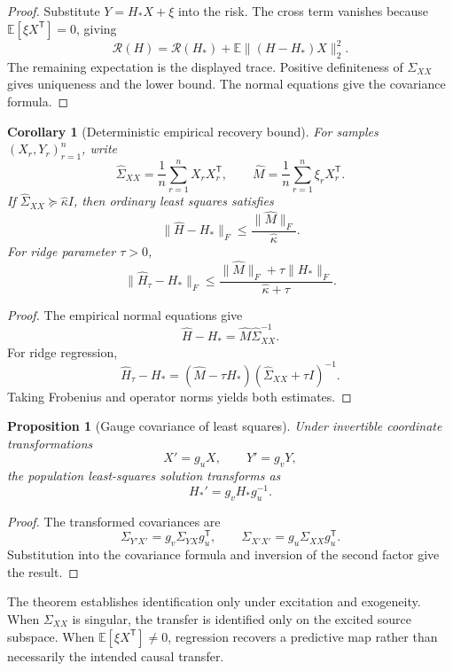\documentclass[11pt,letterpaper]{article}
\theoremstyle{plain}
\newtheorem{proposition}[theorem]{Proposition}
\newtheorem{corollary}[theorem]{Corollary}
\theoremstyle{definition}
\begin{document}
\begin{proof}
Substitute \(Y=H_*X+\xi\) into the risk. The cross term vanishes because
\(\mathbb E[\xi X^{\mathsf T}]=0\), giving
\[
\mathcal R(H)
=
\mathcal R(H_*)
+
\mathbb E\|(H-H_*)X\|_2^2.
\]
The remaining expectation is the displayed trace. Positive definiteness of
\(\Sigma_{XX}\) gives uniqueness and the lower bound. The normal equations
give the covariance formula.
\end{proof}

\begin{corollary}[Deterministic empirical recovery bound]
\label{cor:empirical-transfer-bound}
For samples \((X_r,Y_r)_{r=1}^n\), write
\[
\widehat\Sigma_{XX}
=
\frac1n\sum_{r=1}^nX_rX_r^{\mathsf T},
\qquad
\widehat M
=
\frac1n\sum_{r=1}^n\xi_rX_r^{\mathsf T}.
\]
If \(\widehat\Sigma_{XX}\succeq\widehat\kappa I\), then ordinary least squares
satisfies
\[
\boxed{
\|\widehat H-H_*\|_F
\leq
\frac{\|\widehat M\|_F}{\widehat\kappa}.
}
\]
For ridge parameter \(\tau>0\),
\[
\boxed{
\|\widehat H_\tau-H_*\|_F
\leq
\frac{
\|\widehat M\|_F+\tau\|H_*\|_F
}{
\widehat\kappa+\tau
}.
}
\]
\end{corollary}

\begin{proof}
The empirical normal equations give
\[
\widehat H-H_*
=
\widehat M\widehat\Sigma_{XX}^{-1}.
\]
For ridge regression,
\[
\widehat H_\tau-H_*
=
(\widehat M-\tau H_*)
(\widehat\Sigma_{XX}+\tau I)^{-1}.
\]
Taking Frobenius and operator norms yields both estimates.
\end{proof}

\begin{proposition}[Gauge covariance of least squares]
\label{prop:ols-gauge-covariance}
Under invertible coordinate transformations
\[
X'=g_uX,
\qquad
Y'=g_vY,
\]
the population least-squares solution transforms as
\[
H_*'=g_vH_*g_u^{-1}.
\]
\end{proposition}

\begin{proof}
The transformed covariances are
\[
\Sigma_{Y'X'}=g_v\Sigma_{YX}g_u^{\mathsf T},
\qquad
\Sigma_{X'X'}=g_u\Sigma_{XX}g_u^{\mathsf T}.
\]
Substitution into the covariance formula and inversion of the second factor
give the result.
\end{proof}

The theorem establishes identification only under excitation and exogeneity.
When \(\Sigma_{XX}\) is singular, the transfer is identified only on the
excited source subspace. When \(\mathbb E[\xi X^{\mathsf T}]\neq0\), regression
recovers a predictive map rather than necessarily the intended causal
transfer.
\end{document}
